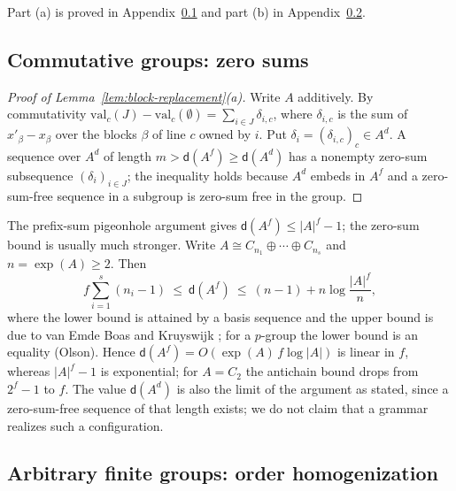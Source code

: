 Part (a) is proved in Appendix~\ref{app:window-abelian} and part (b) in
Appendix~\ref{app:window-group}.

\subsection{Commutative groups: zero sums}
\label{app:window-abelian}

\begin{proof}[Proof of Lemma~\ref{lem:block-replacement}(a)]
Write $A$ additively.  By commutativity
$\mathrm{val}_c(J)-\mathrm{val}_c(\emptyset)=\sum_{i\in J}\delta_{i,c}$, where
$\delta_{i,c}$ is the sum of $x'_\beta-x_\beta$ over the blocks $\beta$ of
line $c$ owned by $i$.  Put $\delta_i=(\delta_{i,c})_c\in A^d$.  A sequence
over $A^d$ of length $m>\mathsf d(A^f)\ge\mathsf d(A^d)$ has a nonempty
zero-sum subsequence $(\delta_i)_{i\in J}$; the inequality holds because $A^d$
embeds in $A^f$ and a zero-sum-free sequence in a subgroup is zero-sum free in
the group.
\end{proof}

\begin{remark}
\label{rem:davenport-size}
The prefix-sum pigeonhole argument gives $\mathsf d(A^f)\le|A|^f-1$; the
zero-sum bound is usually much stronger.  Write
$A\cong C_{n_1}\oplus\cdots\oplus C_{n_s}$ and $n=\exp(A)\ge2$.  Then
\[
 f\sum_{i=1}^{s}(n_i-1)\ \le\ \mathsf d(A^f)\ \le\
 (n-1)+n\log\frac{|A|^f}{n},
\]
where the lower bound is attained by a basis sequence and the upper bound is
due to van Emde Boas and Kruyswijk
\cite[Proposition~5.1.8 and Theorem~5.5.5]{GeroldingerHalterKoch2006}; for a
$p$-group the lower bound is an equality
\cite[Theorem~5.5.9]{GeroldingerHalterKoch2006} (Olson).  Hence
$\mathsf d(A^f)=O(\exp(A)\,f\log|A|)$ is linear in $f$, whereas $|A|^f-1$ is
exponential; for $A=C_2$ the antichain bound drops from $2^f-1$ to $f$.  The
value $\mathsf d(A^d)$ is also the limit of the argument as stated, since a
zero-sum-free sequence of that length exists; we do not claim that a grammar
realizes such a configuration.
\end{remark}

\subsection{Arbitrary finite groups: order homogenization}
\label{app:window-group}

